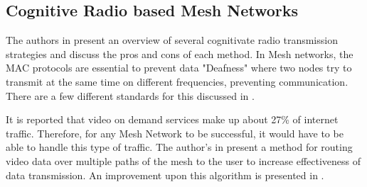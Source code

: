 \subsection{Cognitive Radio based Mesh Networks}

The authors in \cite{5457862} present an overview of several cognitivate radio transmission strategies and discuss the pros and cons of each method. 
In Mesh networks, the MAC protocols are essential to prevent data "Deafness" where two nodes try to
transmit at the same time on different frequencies, preventing communication. There are a few 
different standards for this discussed in \cite{6392009}.

It is reported that video on demand services make up about 27\% of internet traffic. Therefore,
for any Mesh Network to be successful, it would have to be able to handle this type of traffic. The
author's in \cite{6112757} present a method for routing video data over multiple paths of the mesh
to the user to increase effectiveness of data transmission. An improvement upon this algorithm
is presented in \cite{6778761}. 

